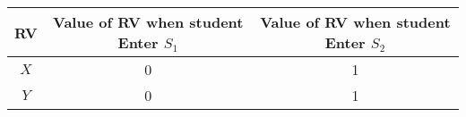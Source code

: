 
\begin{center}
\begin{tabular}{|c|c|c|}
\hline
\textbf{RV} & \textbf{Value of RV when student Enter $S_1$} &  \textbf{Value of RV when student Enter $S_2$} \\ \hline
$X$		   	&   0      & 1\\ \hline
$Y$ 		&	0      & 1\\ \hline
\end{tabular}
\end{center}